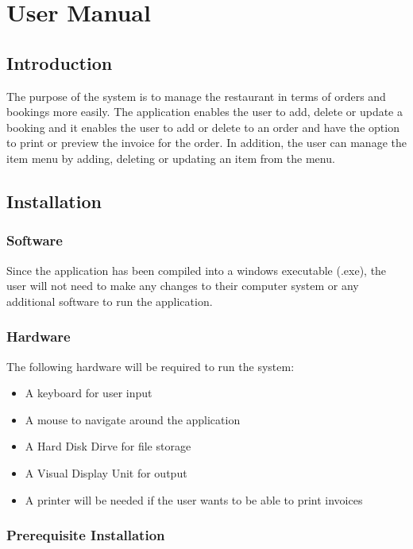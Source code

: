 \chapter{User Manual}

\section{Introduction}
The purpose of the system is to manage the restaurant in terms of orders and bookings more easily. The application enables the user to add, delete or update a booking and it enables the user to add or delete to an order and have the option to print or preview the invoice for the order. In addition, the user can manage the item menu by adding, deleting or updating an item from the menu.

\section{Installation}

\subsection{Software}
Since the application has been compiled into a windows executable (.exe), the user will not need to make any changes to their computer system or any additional software to run the application.

\subsection{Hardware}

The following hardware will be required to run the system:

\begin{itemize}

	\item A keyboard for user input
	\item A mouse to navigate around the application
	\item A Hard Disk Dirve for file storage 
	\item A Visual Display Unit for output
	\item A printer will be needed if the user wants to be able to print invoices
	

\end{itemize}



\subsection{Prerequisite Installation}

